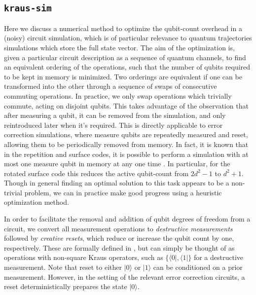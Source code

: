 \subsection{\texttt{kraus-sim}}
\label{sec:reordering}
Here we discuss a numerical method to optimize the qubit-count overhead in a (noisy) circuit simulation, which is of particular relevance to quantum trajectories simulations which store the full state vector. The aim of the optimization is, given a particular circuit description as a sequence of quantum channels, to find an equivalent ordering of the operations, such that the number of qubits required to be kept in memory is minimized. Two orderings are equivalent if one can be transformed into the other through a sequence of swaps of consecutive commuting operations. In practice, we only swap operations which trivially commute, acting on disjoint qubits. 
This takes advantage of the observation that after measuring a qubit, it can be removed from the simulation, and only reintroduced later when it's required. 
This is directly applicable to error correction simulations, where measure qubits are repeatedly measured and reset, allowing them to be periodically removed from memory. In fact, it is known that in the repetition and surface codes, it is possible to perform a simulation with at most one measure qubit in memory at any one time \cite{obrien_DensitymatrixSimulationSmall_2017a, marshall_IncoherentApproximationLeakage_2023}. In particular, for the rotated surface code this reduces the active qubit-count from $2d^2-1$ to $d^2+1$.
Though in general finding an optimal solution to this task appears to be a non-trivial problem, we can in practice make good progress using a heuristic optimization method. 


In order to facilitate the removal and addition of qubit degrees of freedom from a circuit, we convert all measurement operations to \textit{destructive measurements} followed by \textit{creative resets}, which reduce or increase the qubit count by one, respectively. These are formally defined in \cite{marshall_IncoherentApproximationLeakage_2023}, but can simply be thought of as operations with non-square Kraus operators, such as $\{\langle 0|, \langle 1|\}$ for a destructive measurement. Note that reset to either $|0\rangle$ or $|1\rangle$ can be conditioned on a prior measurement. However, in the setting of the relevant error correction circuits, a reset deterministically prepares the state $|0\rangle$.

